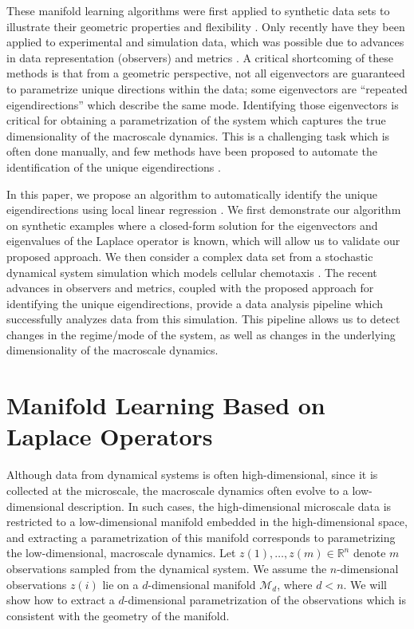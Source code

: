 These manifold learning algorithms were first applied to synthetic data sets to illustrate their geometric properties and flexibility \cite{coifman2005geometric, nadler2006diffusion}.
%
Only recently have they been applied to experimental and simulation data, which was possible due to advances in data representation (observers) and metrics \cite{rubner2000earth,mallat2012group,talmon2013empirical,zhao2014rotationally, rohrdanz2011determination}.
%
A critical shortcoming of these methods is that from a geometric perspective, not all eigenvectors are guaranteed to parametrize unique directions within the data; some eigenvectors are ``repeated eigendirections'' which describe the same mode.
%
Identifying those eigenvectors is critical for obtaining a parametrization of the system which captures the true dimensionality of the macroscale dynamics.
%
This is a challenging task which is often done manually, and few methods have been proposed to automate the identification of the unique eigendirections \cite{gerber2007robust}.

In this paper, we propose an algorithm to automatically identify the unique eigendirections using local linear regression \cite{wasserman2006all}.
%
We first demonstrate our algorithm on synthetic examples where a closed-form solution for the eigenvectors and eigenvalues of the Laplace operator is known, which will allow us to validate our proposed approach.
%
We then consider a complex data set from a stochastic dynamical system simulation which models cellular chemotaxis \cite{othmer1988models}.
%
The recent advances in observers and metrics, coupled with the proposed approach for identifying the unique eigendirections, provide a data analysis pipeline which successfully analyzes data from this simulation.
%
This pipeline allows us to detect changes in the regime/mode of the system, as well as changes in the underlying dimensionality of the macroscale dynamics.


\section{Manifold Learning Based on Laplace Operators}

Although data from dynamical systems is often high-dimensional, since it is collected at the microscale, the macroscale dynamics often evolve to a low-dimensional description.
%
In such cases, the high-dimensional microscale data is restricted to a low-dimensional manifold embedded in the high-dimensional space, and extracting a parametrization of this manifold corresponds to parametrizing the low-dimensional, macroscale dynamics.
%
Let $z(1), \dots, z(m) \in \mathbb{R}^n$ denote $m$ observations sampled from the dynamical system.
%
We assume the $n$-dimensional observations $z(i)$ lie on a $d$-dimensional manifold $\mathcal{M}_d$, where $d < n$.
%
We will show how to extract a $d$-dimensional parametrization of the observations which is consistent with the geometry of the manifold.

